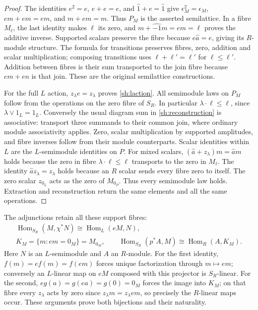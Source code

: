 \documentclass[11pt]{article}
\DeclareMathOperator{\Hom}{Hom}
\begin{document}
\begin{proof}
The identities $e^2=e$, $e+e=e$, and $\widehat1+e=\widehat1$
give $\epsilon_M^2=\epsilon_M$,
$em+em=em$, and $m+em=m$. Thus $P_M$ is the asserted
semilattice. In a fibre $M_\ell$, the last identity makes $\ell$
its zero, and $m+\widehat{-1}m=em=\ell$ proves the additive
inverse. Supported scalars preserve the fibre because
$e\widehat a=e$, giving its $R$-module structure. The formula
for transitions preserves fibres, zero, addition and scalar
multiplication; composing transitions uses
$\ell+\ell'=\ell'$ for $\ell\le\ell'$. Addition between fibres
is their sum transported to the join fibre because $em+en$
is that join. These are the original semilattice constructions.

For the full $L$ action, $z_\lambda e=z_\lambda$ proves
\eqref{sh:laction}. All semimodule laws on $P_M$ follow from
the operations on the zero fibre of $S_R$. In particular
$\lambda\cdot\ell\le\ell$, since $\lambda\vee1_L=1_L$.
Conversely the usual diagram sum in \eqref{sh:reconstruction}
is associative: transport three summands to their common join,
where ordinary module associativity applies. Zero, scalar
multiplication by supported amplitudes, and fibre inverses follow
from their module counterparts. Scalar identities within $L$ are
the $L$-semimodule identities on $P$. For mixed scalars,
$(\widehat a+z_\lambda)m=\widehat a m$ holds because the zero
in fibre $\lambda\cdot\ell\le\ell$ transports to the zero in
$M_\ell$. The identity $\widehat a z_\lambda=z_\lambda$
holds because an $R$ scalar sends every fibre zero to itself.
The zero scalar $z_{0_L}$ acts as the zero of $M_{0_P}$.
Thus every semimodule law holds. Extraction and reconstruction
return the same elements and all the same operations.
\end{proof}

The adjunctions retain all these support fibres:
\begin{equation}\tag{SH14}\label{sh:adjunctions}
 \begin{gathered}
 \Hom_{S_R}(M,\chi^*N)\cong\Hom_L(eM,N),\\
 K_M=\{m:em=0_M\}=M_{0_M},\qquad
 \Hom_{S_R}(p^*A,M)\cong\Hom_R(A,K_M).
 \end{gathered}
\end{equation}
Here $N$ is an $L$-semimodule and $A$ an $R$-module.
For the first identity, $f(m)=ef(m)=f(em)$ forces unique
factorization through $m\mapsto em$; conversely an $L$-linear
map on $eM$ composed with this projector is $S_R$-linear.
For the second, $eg(a)=g(ea)=g(0)=0_M$ forces the image into
$K_M$; on that fibre every $z_\lambda$ acts by zero since
$z_\lambda m=z_\lambda em$, so precisely the $R$-linear
maps occur. These arguments prove both bijections and their
naturality.
\end{document}
